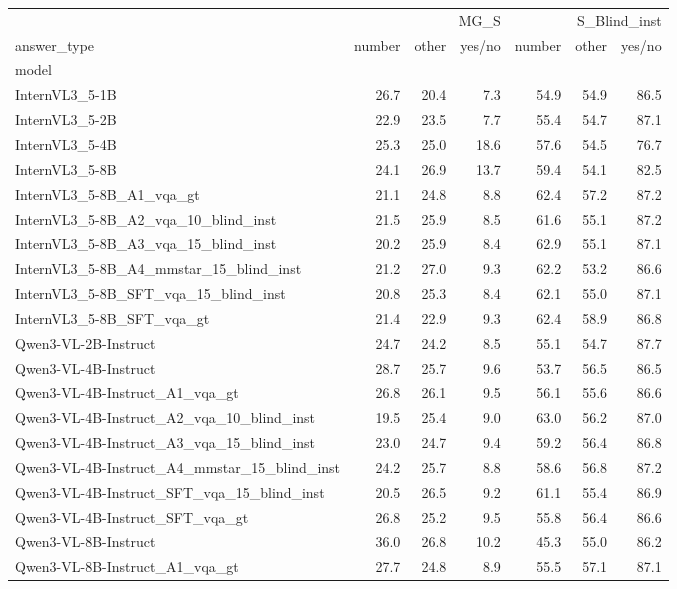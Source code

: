 \begin{tabular}{lrrrrrr}
\toprule
 & \multicolumn{3}{r}{MG_S} & \multicolumn{3}{r}{S_Blind_inst} \\
answer_type & number & other & yes/no & number & other & yes/no \\
model &  &  &  &  &  &  \\
\midrule
InternVL3_5-1B & 26.7 & 20.4 & 7.3 & 54.9 & 54.9 & 86.5 \\
InternVL3_5-2B & 22.9 & 23.5 & 7.7 & 55.4 & 54.7 & 87.1 \\
InternVL3_5-4B & 25.3 & 25.0 & 18.6 & 57.6 & 54.5 & 76.7 \\
InternVL3_5-8B & 24.1 & 26.9 & 13.7 & 59.4 & 54.1 & 82.5 \\
InternVL3_5-8B_A1_vqa_gt & 21.1 & 24.8 & 8.8 & 62.4 & 57.2 & 87.2 \\
InternVL3_5-8B_A2_vqa_10_blind_inst & 21.5 & 25.9 & 8.5 & 61.6 & 55.1 & 87.2 \\
InternVL3_5-8B_A3_vqa_15_blind_inst & 20.2 & 25.9 & 8.4 & 62.9 & 55.1 & 87.1 \\
InternVL3_5-8B_A4_mmstar_15_blind_inst & 21.2 & 27.0 & 9.3 & 62.2 & 53.2 & 86.6 \\
InternVL3_5-8B_SFT_vqa_15_blind_inst & 20.8 & 25.3 & 8.4 & 62.1 & 55.0 & 87.1 \\
InternVL3_5-8B_SFT_vqa_gt & 21.4 & 22.9 & 9.3 & 62.4 & 58.9 & 86.8 \\
Qwen3-VL-2B-Instruct & 24.7 & 24.2 & 8.5 & 55.1 & 54.7 & 87.7 \\
Qwen3-VL-4B-Instruct & 28.7 & 25.7 & 9.6 & 53.7 & 56.5 & 86.5 \\
Qwen3-VL-4B-Instruct_A1_vqa_gt & 26.8 & 26.1 & 9.5 & 56.1 & 55.6 & 86.6 \\
Qwen3-VL-4B-Instruct_A2_vqa_10_blind_inst & 19.5 & 25.4 & 9.0 & 63.0 & 56.2 & 87.0 \\
Qwen3-VL-4B-Instruct_A3_vqa_15_blind_inst & 23.0 & 24.7 & 9.4 & 59.2 & 56.4 & 86.8 \\
Qwen3-VL-4B-Instruct_A4_mmstar_15_blind_inst & 24.2 & 25.7 & 8.8 & 58.6 & 56.8 & 87.2 \\
Qwen3-VL-4B-Instruct_SFT_vqa_15_blind_inst & 20.5 & 26.5 & 9.2 & 61.1 & 55.4 & 86.9 \\
Qwen3-VL-4B-Instruct_SFT_vqa_gt & 26.8 & 25.2 & 9.5 & 55.8 & 56.4 & 86.6 \\
Qwen3-VL-8B-Instruct & 36.0 & 26.8 & 10.2 & 45.3 & 55.0 & 86.2 \\
Qwen3-VL-8B-Instruct_A1_vqa_gt & 27.7 & 24.8 & 8.9 & 55.5 & 57.1 & 87.1 \\

\end{tabular}
